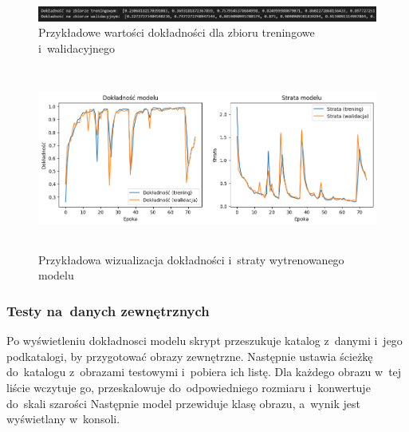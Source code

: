 \begin{figure}[ht]
	\centering
	\includegraphics[width=15.5cm]{resources/model/images/scr-standard-result.png}
	\caption{Przykładowe wartości dokładności dla zbioru treningowe i~walidacyjnego}
	\label{Fig:tests-wyniki-2}
\end{figure}
\FloatBarrier

\begin{figure}[ht]
	\centering
	\includegraphics[height=6cm]{resources/model/images/v2_epoch75.png}
	\caption{Przykładowa wizualizacja dokładności i~straty wytrenowanego modelu}
	\label{Fig:tests-wyniki-1}
\end{figure}
\FloatBarrier

\subsubsection{Testy na~danych zewnętrznych}
Po wyświetleniu dokładnosci modelu skrypt przeszukuje katalog z~danymi i~jego podkatalogi, by przygotować obrazy zewnętrzne.
Następnie ustawia ścieżkę do~katalogu z~obrazami testowymi i~pobiera ich listę.
Dla każdego obrazu w~tej liście wczytuje go, przeskalowuje do~odpowiedniego rozmiaru i~konwertuje do~skali szarości
Następnie model przewiduje klasę obrazu, a~wynik jest wyświetlany w~konsoli.